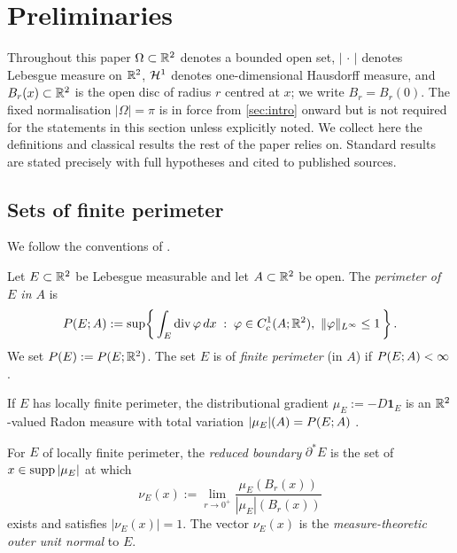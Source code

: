 \section{Preliminaries}\label{sec:prelim}

Throughout this paper $\Omega\subset\mathbb{R}^2$ denotes a bounded open set,
$|\,\cdot\,|$ denotes Lebesgue measure on $\mathbb{R}^2$, $\mathcal{H}^1$ denotes
one-dimensional Hausdorff measure, and $B_r(x)\subset\mathbb{R}^2$ is the open disc
of radius $r$ centred at $x$; we write $B_r = B_r(0)$.  The fixed
normalisation $|\Omega|=\pi$ is in force from \cref{sec:intro} onward but is
not required for the statements in this section unless explicitly noted.  We
collect here the definitions and classical results the rest of the paper relies
on.  Standard results are stated precisely with full hypotheses and cited to
published sources.

\subsection{Sets of finite perimeter}

We follow the conventions of \cite{Maggi2012}.

\begin{definition}[Perimeter]\label{def:perimeter}
Let $E\subset\mathbb{R}^2$ be Lebesgue measurable and let $A\subset\mathbb{R}^2$ be open.
The \emph{perimeter of $E$ in $A$} is
\[
  P(E;A) := \sup\!\left\{\,\int_E \operatorname{div}\varphi\,dx \;:\;
    \varphi\in C^1_c(A;\mathbb{R}^2),\ \|\varphi\|_{L^\infty}\le 1\,\right\}.
\]
We set $P(E):=P(E;\mathbb{R}^2)$.  The set $E$ is of \emph{finite perimeter} (in
$A$) if $P(E;A)<\infty$.
\end{definition}

If $E$ has locally finite perimeter, the distributional gradient
$\mu_E := -D\mathbf{1}_E$ is an $\mathbb{R}^2$-valued Radon measure with total
variation $|\mu_E|(A)=P(E;A)$
\cite[Proposition~12.1, Definition~12.1]{Maggi2012}.

\begin{definition}\label{def:reduced-boundary}
For $E$ of locally finite perimeter, the \emph{reduced boundary} $\partial^*E$
is the set of $x\in\operatorname{supp}|\mu_E|$ at which
\[
  \nu_E(x) := \lim_{r\to 0^+}\frac{\mu_E(B_r(x))}{|\mu_E|(B_r(x))}
\]
exists and satisfies $|\nu_E(x)|=1$.  The vector $\nu_E(x)$ is the
\emph{measure-theoretic outer unit normal} to $E$.
\end{definition}

